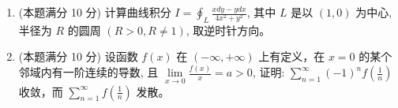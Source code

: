\begin{enumerate}
{	\textbf{算 $\iint_D x\,dxdy$.}
	\begin{align*}
	\iint_{D}x\,dxdy&=\int_0^1\!\!2x\,dx+\int_1^2\!\!x(4-2x)dx\\
	&=1+\left[2x^2-\tfrac23x^3\right]_1^2=1+\tfrac43=\tfrac73 .
	\end{align*}

	\textbf{算 $\iint_D|y|\,dxdy$.} 当 $0\leqslant x\leqslant1$ 时 $x-1\leqslant0\leqslant x+1$，
	\[
	\int_{x-1}^{x+1}\!|y|dy=\frac{(1-x)^2+(1+x)^2}{2}=1+x^2 ;
	\]
	当 $1\leqslant x\leqslant2$ 时积分区间全在 $y\geqslant0$ 内，
	\[
	\int_{x-1}^{3-x}\!y\,dy=\frac{(3-x)^2-(x-1)^2}{2}=4-2x .
	\]
	故
	\[
	\iint_{D}|y|dxdy=\int_0^1\!\!\left(1+x^2\right)dx+\int_1^2\!\!(4-2x)dx=\tfrac43+1=\tfrac73 .
	\]

	\textbf{合并.} $I=\dfrac73+\dfrac73=\dfrac{14}{3}\approx4.667$（数值积分给出 $4.6667$，吻合）。
}


\item 
(本题满分 10 分)
计算曲线积分 $I=\oint_{L} \frac{x d y-y d x}{4 x^{2}+y^{2}}$, 其中 $L$ 是以 $(1,0)$ 为中心, 半径为 $R$ 的圆周 $(R>0, R \neq 1)$, 取逆时针方向。




\item 
(本题满分 10 分)
设函数 $f(x)$ 在 $(-\infty,+\infty)$ 上有定义，在 $x=0$ 的某个邻域内有一阶连续的导数, 且 $\lim\limits _{x \rightarrow 0} \frac{f(x)}{x}=a>0$, 证明:
$\sum\limits_{n=1}^{\infty}(-1)^{n} f\left(\frac{1}{n}\right)$ 收敛，而 $\sum\limits_{n=1}^{\infty} f\left(\frac{1}{n}\right)$ 发散。




\end{enumerate}
